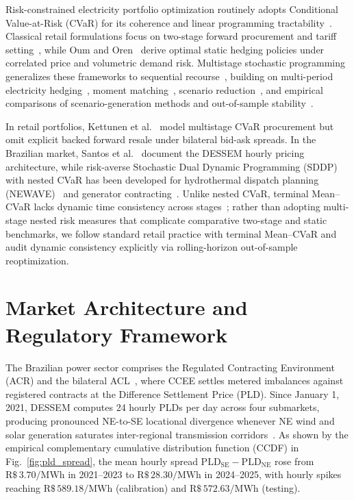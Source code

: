 \documentclass[10pt,journal]{IEEEtran}
\begin{document}
Risk-constrained electricity portfolio optimization routinely adopts Conditional Value-at-Risk (CVaR) for its coherence and linear programming tractability~\cite{Conejo2010,BirgeLouveaux2011,RockafellarUryasev2000,RockafellarUryasev2002,Mansini2007}. Classical retail formulations focus on two-stage forward procurement and tariff setting~\cite{Carrion2007,Hatami2009}, while Oum and Oren~\cite{OumOren2010} derive optimal static hedging policies under correlated price and volumetric demand risk. Multistage stochastic programming generalizes these frameworks to sequential recourse~\cite{BirgeLouveaux2011,PflugPichler2014,Shapiro2021}, building on multi-period electricity hedging~\cite{Fleten2002}, moment matching~\cite{HoylandWallace2001}, scenario reduction~\cite{HeitschRomisch2003,HeitschRomisch2009}, and empirical comparisons of scenario-generation methods and out-of-sample stability~\cite{KautWallace2007,Lohndorf2016}.

In retail portfolios, Kettunen et al.~\cite{Kettunen2010} model multistage CVaR procurement but omit explicit backed forward resale under bilateral bid-ask spreads. In the Brazilian market, Santos et al.~\cite{Santos2020} document the DESSEM hourly pricing architecture, while risk-averse Stochastic Dual Dynamic Programming (SDDP) with nested CVaR has been developed for hydrothermal dispatch planning (NEWAVE)~\cite{PhilpottMatos2012,Shapiro2013} and generator contracting~\cite{Street2009,Fanzeres2015,EPSR2026}. Unlike nested CVaR, terminal Mean--CVaR lacks dynamic time consistency across stages~\cite{Shapiro2009,Shapiro2021}; rather than adopting multi-stage nested risk measures that complicate comparative two-stage and static benchmarks, we follow standard retail practice with terminal Mean--CVaR and audit dynamic consistency explicitly via rolling-horizon out-of-sample reoptimization.

\section{Market Architecture and Regulatory Framework}
\label{sec:market}

The Brazilian power sector comprises the Regulated Contracting Environment (ACR) and the bilateral ACL~\cite{CCEE2024}, where CCEE settles metered imbalances against registered contracts at the Difference Settlement Price (PLD). Since January 1, 2021, DESSEM computes 24 hourly PLDs per day across four submarkets, producing pronounced NE-to-SE locational divergence whenever NE wind and solar generation saturates inter-regional transmission corridors~\cite{Santos2020,CCEE2024}. As shown by the empirical complementary cumulative distribution function (CCDF) in Fig.~\ref{fig:pld_spread}, the mean hourly spread $\text{PLD}_{\text{SE}} - \text{PLD}_{\text{NE}}$ rose from $\text{R\$}\,3.70/\text{MWh}$ in 2021--2023 to $\text{R\$}\,28.30/\text{MWh}$ in 2024--2025, with hourly spikes reaching $\text{R\$}\,589.18/\text{MWh}$ (calibration) and $\text{R\$}\,572.63/\text{MWh}$ (testing).
\end{document}
